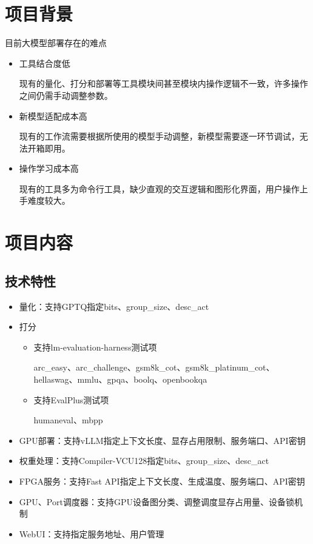 \documentclass[AutoFakeBold,AutoFakeSlant,language=chinese,degree=bachelor]{sustechthesis}
\begin{document}

\section{项目背景}
目前大模型部署存在的难点
\begin{itemize}
    \item 工具结合度低
    
        现有的量化、打分和部署等工具模块间甚至模块内操作逻辑不一致，许多操作之间仍需手动调整参数。
    \item 新模型适配成本高
    
        现有的工作流需要根据所使用的模型手动调整，新模型需要逐一环节调试，无法开箱即用。
    \item 操作学习成本高
    
        现有的工具多为命令行工具，缺少直观的交互逻辑和图形化界面，用户操作上手难度较大。
\end{itemize}

\section{项目内容}
\subsection{技术特性}
\begin{itemize}
    \item 量化：支持GPTQ指定bits、group\_size、desc\_act
    \item 打分
        \begin{itemize}
            \item 支持lm-evaluation-harness测试项
            
                arc\_easy、arc\_challenge、gsm8k\_cot、gsm8k\_platinum\_cot、hellaswag、mmlu、gpqa、boolq、openbookqa
            \item 支持EvalPlus测试项
            
                humaneval、mbpp
        \end{itemize}

    \item GPU部署：支持vLLM指定上下文长度、显存占用限制、服务端口、API密钥
    \item 权重处理：支持Compiler-VCU128指定bits、group\_size、desc\_act
    \item FPGA服务：支持Fast API指定上下文长度、生成温度、服务端口、API密钥
    \item GPU、Port调度器：支持GPU设备图分类、调整调度显存占用量、设备锁机制
    \item WebUI：支持指定服务地址、用户管理
\end{itemize}
\end{document}
